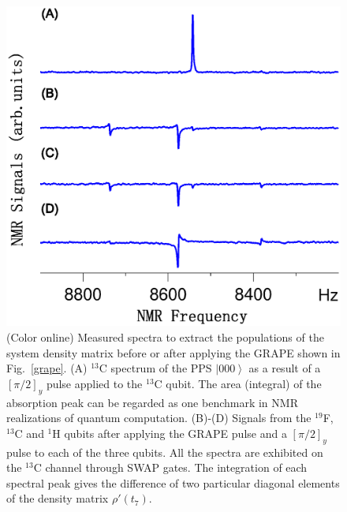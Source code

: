 \documentclass[twocolumn,showpacs,twoside,10pt,prl]{revtex4}
\begin{document}
\begin{figure}[h]
\includegraphics[width=0.95\columnwidth]{signal.eps}
\centering
\caption{\footnotesize{(Color online) Measured spectra to extract the populations of the system density matrix before or after applying the GRAPE shown in Fig.~\ref{grape}.
(A) $^{13}$C spectrum of the PPS $\left\vert 000 \right\rangle$ as a result of a $[\pi/2]_y$ pulse applied to the $^{13}$C qubit.
The area (integral) of the absorption peak can be regarded as one benchmark in NMR realizations of
quantum computation. (B)-(D) Signals from the $^{19}$F, $^{13}$C and $^1$H qubits after applying the GRAPE pulse and a $[\pi/2]_y$ pulse to each of the three qubits. All the spectra are exhibited on the $^{13}$C channel through SWAP gates. The integration of each spectral peak gives the difference of two particular diagonal elements of the density matrix $\rho'(t_7)$.}}
\label{signal}
\end{figure}
\end{document}
